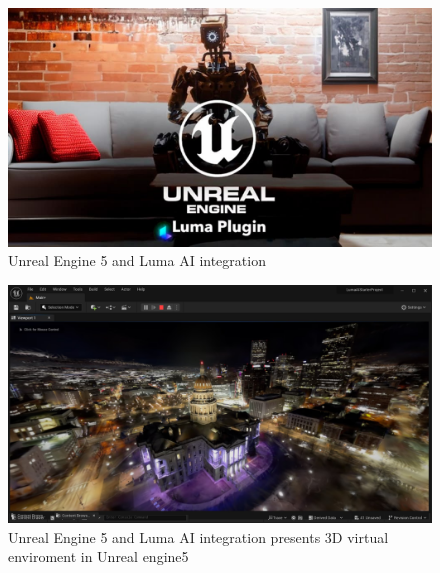 \begin{figure}[htbp]
  \centering
  \includegraphics[scale=0.35]{./Figure/画像21.jpg}
  \caption{Unreal Engine 5 and Luma AI integration}
  \label{fig:Unreal Engine 5 and Luma AI integration}
\end{figure}
\begin{figure}[htbp]
  \centering
  \includegraphics[scale=0.2]{./Figure/ppp.png}
  \caption{Unreal Engine 5 and Luma AI integration presents 3D virtual enviroment in Unreal engine5}
  \label{fig:Unreal Engine 5 and Luma AI integration presents 3D virtual enviroment in Unreal engine5}
\end{figure}

